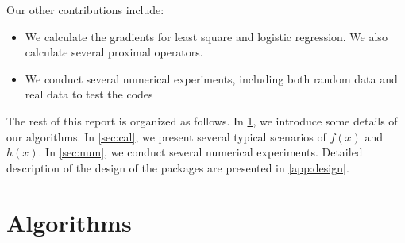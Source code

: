 \documentclass[a4paper]{article}
\begin{document}
  Our other contributions include:
  \begin{itemize}
    \item We calculate the gradients for least 
    square and logistic regression. We also calculate several 
    proximal operators.
    \item We conduct several numerical experiments, including both 
    random data and real data to test the codes
  \end{itemize}

  The rest of this report is organized as follows. In \cref{sec:alg}, 
  we introduce some details of our algorithms. In \cref{sec:cal}, we 
  present several typical scenarios of $f(x)$ and $h(x)$. In 
  \cref{sec:num}, we conduct several numerical experiments. Detailed 
  description of the design of the packages are presented in 
  \cref{app:design}.
  
  
  
  \section{Algorithms}
  \label{sec:alg}
  
\end{document}
